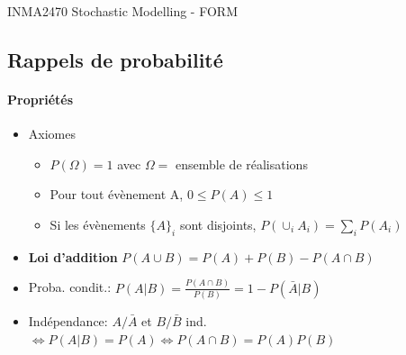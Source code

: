 \documentclass[paper=a4,fontsize=8pt,pagesize,DIV=calc]{scrartcl}
\newcounter{row}
\begin{document}

\begin{center}
{\Large INMA2470 Stochastic Modelling - FORM}
\end{center}

\begin{multicols}{3}

\section{Rappels de probabilité}
\paragraph{Propriétés}
\begin{itemize}
\item Axiomes
\begin{itemize}
\item $P(\Omega)=1$ avec $\Omega=$ ensemble de réalisations
\item Pour tout évènement A, $0\leq P(A)\leq 1$
\item Si les évènements $\{A\}_i$ sont disjoints, $P(\cup_iA_i)=\sum_iP(A_i)$
\end{itemize}
\item \textbf{Loi d'addition} $P(A\cup B)=P(A)+P(B)-P(A \cap B)$
\item Proba. condit.: $P(A|B)=\frac{P(A\cap B)}{P(B)}=1-P(\bar{A}|B)$
\item Indépendance: $A/\bar{A}$ et $B/\bar{B}$ ind. $ \Leftrightarrow P(A|B)=P(A)  \Leftrightarrow P(A\cap B)=P(A)P(B)$
\end{itemize}

\end{multicols}
\end{document}
